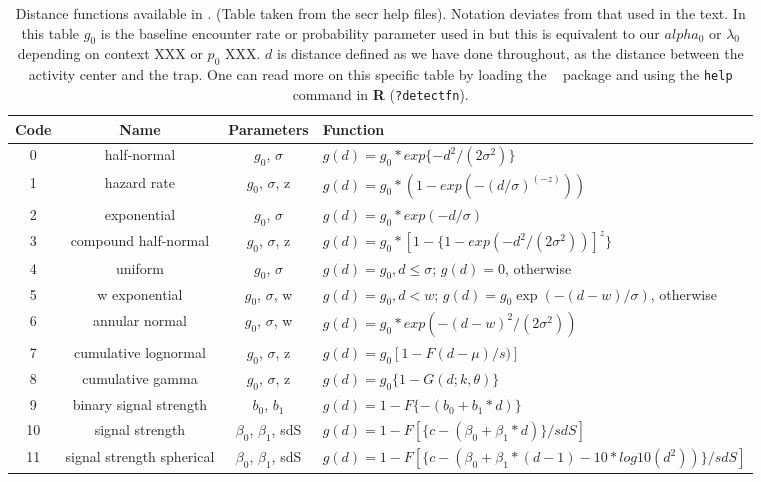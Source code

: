 \begin{table}[ht]
\centering
\caption{Distance functions available in \secr.  (Table taken from the secr
help files). Notation deviates from that used in the text.
In this table $g_{0}$ is the baseline encounter rate or probability
parameter used in \secr but this is equivalent to our $alpha_{0}$ or
$\lambda_{0}$ depending on context XXX or $p_0$ XXX. $d$ is distance defined as we have done throughout,
as the distance between the activity center and the trap.
One can read more on this specific table by loading the \secr~ package and using the
{\tt help} command in {\bf R} ({\tt?detectfn}).
}
\begin{tabular}{cccl}
\hline \hline
Code & Name & Parameters & Function  \\ \hline
0 & half-normal &$g_0$, $\sigma$          &  $g(d) = g_0 * exp\{-d^2 / (2  \sigma^2) \}$  \\
1 &hazard rate  & $g_0$, $\sigma$, z      &  $g(d) = g_0 * (1 - exp(- (d / \sigma) ^(-z) ))$ \\
2 &exponential   &$g_0$, $\sigma$    &  $g(d) = g_0 * exp(- d / \sigma)$ \\
3 &compound half-normal  & $g_0$, $\sigma$, z & $g(d) = g_0 * [1 - \{1 - exp(-d^2 / (2 \sigma^2))]^z\}$ \\
4 &uniform     & $g_0$, $\sigma$     &
\parbox[t]{2in}{ $g(d) = g_{0}, d \leq \sigma$; \\
                 $g(d)= 0$, otherwise
} \\
5 &w exponential            & $g_0$, $\sigma$, w &
\parbox[t]{2in}{ $g(d) = g_{0}, d < w$; \\
                 $g(d) = g_{0} \exp(- (d - w) / \sigma)$, otherwise
} \\
6 &annular normal           & $g_0$, $\sigma$, w & $g(d) = g_0 * exp(-(d-w)^2 / (2 \sigma^2))$ \\
7 &cumulative lognormal     & $g_0$, $\sigma$, z & $g(d) = g_0 [1 -F{(d-\mu)/s)}]$  \\
8 &cumulative gamma         & $g_0$, $\sigma$, z  & $g(d) = g_0 \{ 1 - G (d; k,  \theta) \}$  \\
9 &binary signal strength   & $b_0$, $b_1$       & $g(d) = 1 - F \{- (b_0 + b_1 * d) \}$ \\
10&signal strength          & $\beta_0$, $\beta_1$, sdS  &
  $g(d) = 1 - F[ \{c - (\beta_0 + \beta_1 * d)\} / sdS]$  \\
11&signal strength spherical&  $\beta_0$, $\beta_1$, sdS & 
\parbox[t]{2in}{ $g(d) = 1 - F[\{c - (\beta_0 + \beta_1 * (d-1)- 10 * log10 ( d^2 ) ) \} / sdS ]$ 
} \\

\end{tabular}
\label{covariates.tab.detmodels}
\end{table}

